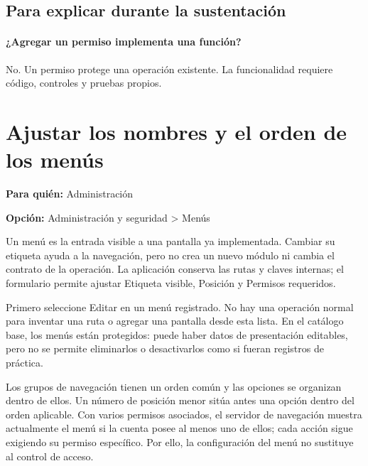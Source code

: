 \subsection{Para explicar durante la sustentación}
\paragraph{¿Agregar un permiso implementa una función?} No. Un permiso protege una operación existente. La funcionalidad requiere código, controles y pruebas propios.


\section{Ajustar los nombres y el orden de los menús}
\label{unidad:operacion_07}
\textbf{Para quién:} Administración\par
\textbf{Opción:} Administración y seguridad > Menús\par

Un menú es la entrada visible a una pantalla ya implementada. Cambiar su etiqueta ayuda a la navegación, pero no crea un nuevo módulo ni cambia el contrato de la operación. La aplicación conserva las rutas y claves internas; el formulario permite ajustar Etiqueta visible, Posición y Permisos requeridos.

Primero seleccione Editar en un menú registrado. No hay una operación normal para inventar una ruta o agregar una pantalla desde esta lista. En el catálogo base, los menús están protegidos: puede haber datos de presentación editables, pero no se permite eliminarlos o desactivarlos como si fueran registros de práctica.

Los grupos de navegación tienen un orden común y las opciones se organizan dentro de ellos. Un número de posición menor sitúa antes una opción dentro del orden aplicable. Con varios permisos asociados, el servidor de navegación muestra actualmente el menú si la cuenta posee al menos uno de ellos; cada acción sigue exigiendo su permiso específico. Por ello, la configuración del menú no sustituye al control de acceso.

